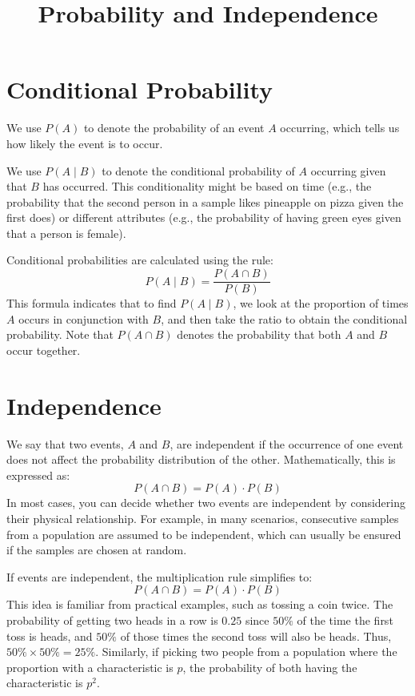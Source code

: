 \documentclass{article}
\title{Probability and Independence}
\author{}
\date{}
\begin{document}
\maketitle

\section{Conditional Probability}

We use \( P(A) \) to denote the probability of an event \( A \) occurring, which tells us how likely the event is to occur.

We use \( P(A \mid B) \) to denote the conditional probability of \( A \) occurring given that \( B \) has occurred. This conditionality might be based on time (e.g., the probability that the second person in a sample likes pineapple on pizza given the first does) or different attributes (e.g., the probability of having green eyes given that a person is female).

Conditional probabilities are calculated using the rule:
\[
P(A \mid B) = \frac{P(A \cap B)}{P(B)}
\]
This formula indicates that to find \( P(A \mid B) \), we look at the proportion of times \( A \) occurs in conjunction with \( B \), and then take the ratio to obtain the conditional probability. Note that \( P(A \cap B) \) denotes the probability that both \( A \) and \( B \) occur together.

\section{Independence}

We say that two events, \( A \) and \( B \), are independent if the occurrence of one event does not affect the probability distribution of the other. Mathematically, this is expressed as:
\[
P(A \cap B) = P(A) \cdot P(B)
\]
In most cases, you can decide whether two events are independent by considering their physical relationship. For example, in many scenarios, consecutive samples from a population are assumed to be independent, which can usually be ensured if the samples are chosen at random.

If events are independent, the multiplication rule simplifies to:
\[
P(A \cap B) = P(A) \cdot P(B)
\]
This idea is familiar from practical examples, such as tossing a coin twice. The probability of getting two heads in a row is \( 0.25 \) since \( 50\% \) of the time the first toss is heads, and \( 50\% \) of those times the second toss will also be heads. Thus, \( 50\% \times 50\% = 25\% \). Similarly, if picking two people from a population where the proportion with a characteristic is \( p \), the probability of both having the characteristic is \( p^2 \).
\end{document}
